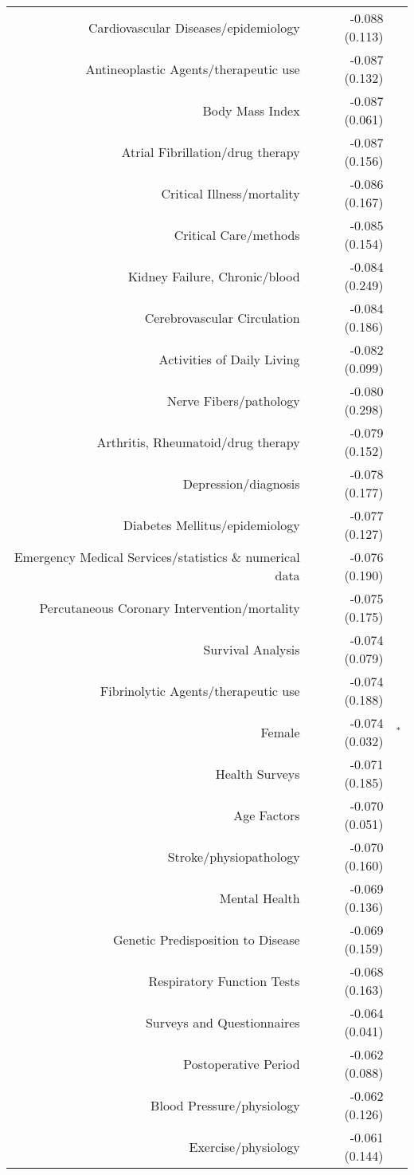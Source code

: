\begin{longtable}[l]{rr@{}l@{ }}
Cardiovascular Diseases/epidemiology & -0.088 (0.113) & $^{}$\\
Antineoplastic Agents/therapeutic use & -0.087 (0.132) & $^{}$\\
Body Mass Index & -0.087 (0.061) & $^{}$\\
Atrial Fibrillation/drug therapy & -0.087 (0.156) & $^{}$\\
Critical Illness/mortality & -0.086 (0.167) & $^{}$\\
Critical Care/methods & -0.085 (0.154) & $^{}$\\
Kidney Failure, Chronic/blood & -0.084 (0.249) & $^{}$\\
Cerebrovascular Circulation & -0.084 (0.186) & $^{}$\\
Activities of Daily Living & -0.082 (0.099) & $^{}$\\
Nerve Fibers/pathology & -0.080 (0.298) & $^{}$\\
Arthritis, Rheumatoid/drug therapy & -0.079 (0.152) & $^{}$\\
Depression/diagnosis & -0.078 (0.177) & $^{}$\\
Diabetes Mellitus/epidemiology & -0.077 (0.127) & $^{}$\\
Emergency Medical Services/statistics \& numerical data & -0.076 (0.190) & $^{}$\\
Percutaneous Coronary Intervention/mortality & -0.075 (0.175) & $^{}$\\
Survival Analysis & -0.074 (0.079) & $^{}$\\
Fibrinolytic Agents/therapeutic use & -0.074 (0.188) & $^{}$\\
Female & -0.074 (0.032) & $^{*}$\\
Health Surveys & -0.071 (0.185) & $^{}$\\
Age Factors & -0.070 (0.051) & $^{}$\\
Stroke/physiopathology & -0.070 (0.160) & $^{}$\\
Mental Health & -0.069 (0.136) & $^{}$\\
Genetic Predisposition to Disease & -0.069 (0.159) & $^{}$\\
Respiratory Function Tests & -0.068 (0.163) & $^{}$\\
Surveys and Questionnaires & -0.064 (0.041) & $^{}$\\
Postoperative Period & -0.062 (0.088) & $^{}$\\
Blood Pressure/physiology & -0.062 (0.126) & $^{}$\\
Exercise/physiology & -0.061 (0.144) & $^{}$\\

\end{longtable}
